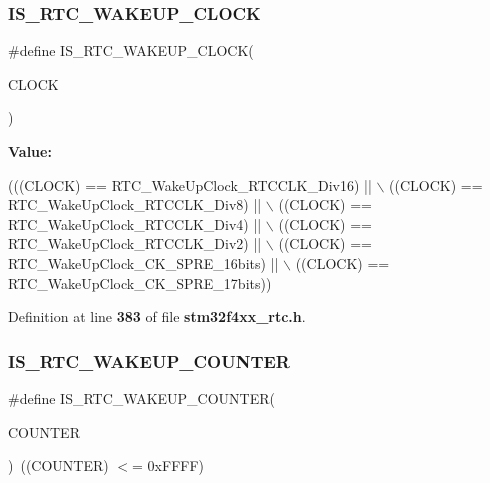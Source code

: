 \subsubsection{I\+S\+\_\+\+R\+T\+C\+\_\+\+W\+A\+K\+E\+U\+P\+\_\+\+C\+L\+O\+CK}
{\footnotesize\ttfamily \#define I\+S\+\_\+\+R\+T\+C\+\_\+\+W\+A\+K\+E\+U\+P\+\_\+\+C\+L\+O\+CK(\begin{DoxyParamCaption}\item[{}]{C\+L\+O\+CK }\end{DoxyParamCaption})}

{\bfseries Value\+:}
\begin{DoxyCode}
(((CLOCK) == RTC_WakeUpClock_RTCCLK_Div16) || \(\backslash\)
                                    ((CLOCK) == RTC_WakeUpClock_RTCCLK_Div8) || \(\backslash\)
                                    ((CLOCK) == RTC_WakeUpClock_RTCCLK_Div4) || \(\backslash\)
                                    ((CLOCK) == RTC_WakeUpClock_RTCCLK_Div2) || \(\backslash\)
                                    ((CLOCK) == RTC_WakeUpClock_CK_SPRE_16bits) || \(\backslash\)
                                    ((CLOCK) == RTC_WakeUpClock_CK_SPRE_17bits))
\end{DoxyCode}


Definition at line \textbf{ 383} of file \textbf{ stm32f4xx\+\_\+rtc.\+h}.

\mbox{\label{group__RTC__Wakeup__Timer__Definitions_ga6254b48843bdcb83b5b5cd640aeb6f9c}} 
\subsubsection{I\+S\+\_\+\+R\+T\+C\+\_\+\+W\+A\+K\+E\+U\+P\+\_\+\+C\+O\+U\+N\+T\+ER}
{\footnotesize\ttfamily \#define I\+S\+\_\+\+R\+T\+C\+\_\+\+W\+A\+K\+E\+U\+P\+\_\+\+C\+O\+U\+N\+T\+ER(\begin{DoxyParamCaption}\item[{}]{C\+O\+U\+N\+T\+ER }\end{DoxyParamCaption})~((C\+O\+U\+N\+T\+ER) $<$= 0x\+F\+F\+F\+F)}



